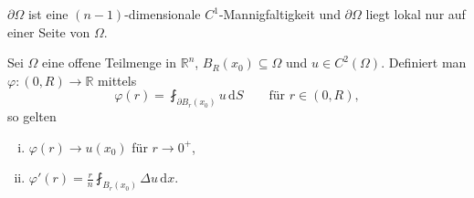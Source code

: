 \begin{bemerkung}
	$\partial \Omega$ ist eine $(n-1)$-dimensionale $C^1$-Mannigfaltigkeit und $\partial \Omega$ liegt lokal nur auf einer Seite von $\Omega$.
\end{bemerkung}

\begin{lemma}
	Sei $\Omega$ eine offene Teilmenge in $\mathbb{R}^n$, $B_R(x_0) \subseteq \Omega$ und $u \in C^2(\Omega)$. Definiert man $\varphi : (0,R) \to \mathbb{R}$ mittels
	\[
		\varphi(r) = \fint_{\partial B_r(x_0)}^{} u \,\mathrm{d}S \qquad \text{für } r \in (0,R),
	\]
	so gelten
	\begin{enumerate}[(i)]
		\item $\varphi(r) \to  u (x_0)$ für $ r \to 0^+$,
		\item $\varphi'(r) = \frac{r}{n} \fint_{B_r(x_0)}^{} \Delta u \,\mathrm{d}x$.
	\end{enumerate}
	\end{lemma}
